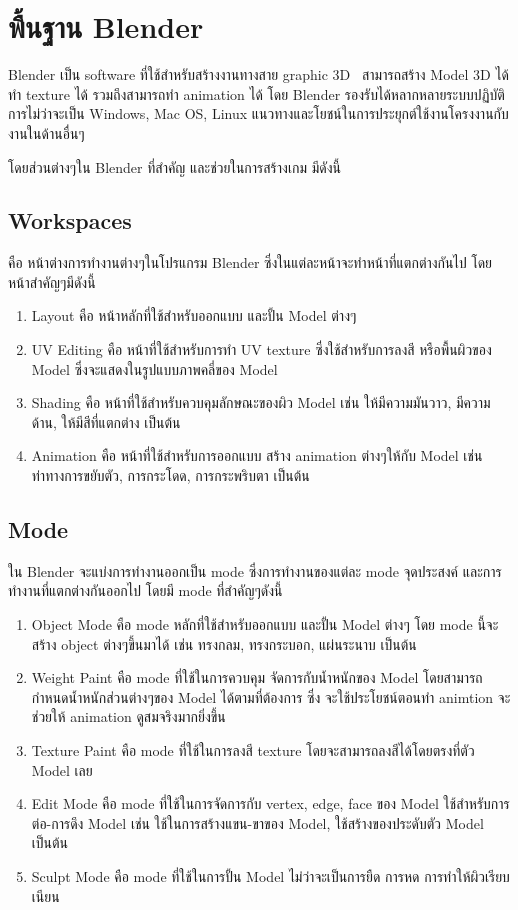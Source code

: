 \section{พื้นฐาน Blender}
\enskip \enskip \enskip \enskip \enskip Blender เป็น software ที่ใช้สำหรับสร้างงานทางสาย graphic 3D~\cite{graphic3D} สามารถสร้าง Model 3D 
ได้ ทำ texture ได้ รวมถึงสามารถทำ animation ได้ โดย Blender รองรับได้หลากหลายระบบปฏิบัติการไม่ว่าจะเป็น Windows, Mac OS, Linux แนวทางและโยชน์ในการประยุกต์ใช้งานโครงงานกับงานในด้านอื่นๆ

\enskip \enskip โดยส่วนต่างๆใน Blender ที่สำคัญ และช่วยในการสร้างเกม มีดังนี้
\subsection{Workspaces}
คือ หน้าต่างการทำงานต่างๆในโปรแกรม Blender ซึ่งในแต่ละหน้าจะทำหน้าที่แตกต่างกันไป โดยหน้าสำคัญๆมีดังนี้
\begin{enumerate}
\item Layout คือ หน้าหลักที่ใช้สำหรับออกแบบ และปั้น Model ต่างๆ
\item UV Editing คือ หน้าที่ใช้สำหรับการทำ UV texture ซึ่งใช้สำหรับการลงสี หรือพื้นผิวของ Model ซึ่งจะแสดงในรูปแบบภาพคลี่ของ Model
\item Shading คือ หน้าที่ใช้สำหรับควบคุมลักษณะของผิว Model เช่น ให้มีความมันวาว, มีความด้าน, ให้มีสีที่แตกต่าง เป็นต้น
\item Animation คือ หน้าที่ใช้สำหรับการออกแบบ สร้าง animation ต่างๆให้กับ Model เช่น ท่าทางการขยับตัว, การกระโดด, การกระพริบตา เป็นต้น
\end{enumerate}
\subsection{Mode}
ใน Blender จะแบ่งการทำงานออกเป็น mode ซึ่งการทำงานของแต่ละ mode จุดประสงค์ และการทำงานที่แตกต่างกันออกไป โดยมี mode ที่สำคัญๆดังนี้
\begin{enumerate}
\item Object Mode คือ mode หลักที่ใช้สำหรับออกแบบ และปั้น Model ต่างๆ โดย mode นี้จะสร้าง object ต่างๆขึ้นมาได้ เช่น 
ทรงกลม, ทรงกระบอก, แผ่นระนาบ เป็นต้น
\item Weight Paint คือ mode ที่ใช้ในการควบคุม จัดการกับน้ำหนักของ Model โดยสามารถกำหนดน้ำหนักส่วนต่างๆของ Model ได้ตามที่ต้องการ 
ซึ่ง จะใช้ประโยชน์ตอนทำ animtion จะช่วยให้ animation ดูสมจริงมากยิ่งขึ้น
\item Texture Paint คือ mode ที่ใช้ในการลงสี texture โดยจะสามารถลงสีได้โดยตรงที่ตัว Model เลย
\item Edit Mode คือ mode ที่ใช้ในการจัดการกับ vertex, edge, face ของ Model ใช้สำหรับการต่อ-การดึง Model เช่น 
ใช้ในการสร้างแขน-ขาของ Model, ใช้สร้างของประดับตัว Model เป็นต้น
\item Sculpt Mode คือ mode ที่ใช้ในการปั้น Model ไม่ว่าจะเป็นการยืด การหด การทำให้ผิวเรียบเนียน
\end{enumerate}

